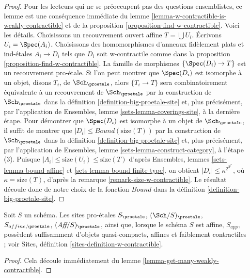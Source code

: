 \begin{proof}
Pour les lecteurs qui ne se préoccupent pas des questions ensemblistes,
ce lemme est une conséquence immédiate du
lemme \ref{lemma-w-contractible-is-weakly-contractible} et de la
proposition \ref{proposition-find-w-contractible}.
Voici les détails.
Choisissons un recouvrement ouvert affine $T = \bigcup U_i$. Écrivons $U_i = \Spec(A_i)$.
Choisissons des homomorphismes d'anneaux fidèlement plats et ind-\'etales $A_i \to D_i$
tels que $D_i$ soit w-contractile comme dans la
proposition \ref{proposition-find-w-contractible}.
La famille de morphismes $\{\Spec(D_i) \to T\}$ est un
recouvrement pro-\'etale.
Si l'on peut montrer que $\Spec(D_i)$ est isomorphe à un objet, disons $T_i$,
de $\Sch_\proetale$, alors $\{T_i \to T\}$ sera combinatoirement
équivalente à un recouvrement de $\Sch_\proetale$ par la construction
de $\Sch_\proetale$ dans la définition \ref{definition-big-proetale-site}
et, plus précisément, par l'application de
Ensembles, lemme \ref{sets-lemma-coverings-site}, à la dernière étape.
Pour démontrer que $\Spec(D_i)$ est isomorphe à un objet de
$\Sch_\proetale$, il suffit de montrer que
$|D_i| \leq Bound(\text{size}(T))$ par la construction
de $\Sch_\proetale$ dans la définition \ref{definition-big-proetale-site}
et, plus précisément, par l'application de
Ensembles, lemme \ref{sets-lemma-construct-category}, à l'étape (3).
Puisque $|A_i| \leq \text{size}(U_i) \leq \text{size}(T)$
d'après Ensembles, lemmes \ref{sets-lemma-bound-affine} et
\ref{sets-lemma-bound-finite-type}, on obtient
$|D_i| \leq \kappa^{2^{2^{2^\kappa}}}$, où $\kappa = \text{size}(T)$,
d'après la remarque \ref{remark-size-w-contractible}.
Le résultat découle donc de notre choix de la fonction $Bound$ dans la
définition \ref{definition-big-proetale-site}.
\end{proof}

\begin{lemma}
\label{lemma-proetale-enough-w-contractible}
Soit $S$ un schéma. Les sites pro-\'etales
$S_\proetale$, $(\Sch/S)_\proetale$, $S_{affine, \proetale}$,
$(\textit{Aff}/S)_\proetale$, ainsi que, lorsque le schéma $S$ est affine, $S_{app}$,
possèdent suffisamment d'objets quasi-compacts, affines et faiblement contractiles ;
voir Sites, définition \ref{sites-definition-w-contractible}.
\end{lemma}

\begin{proof}
Cela découle immédiatement du lemme \ref{lemma-get-many-weakly-contractible}.
\end{proof}


